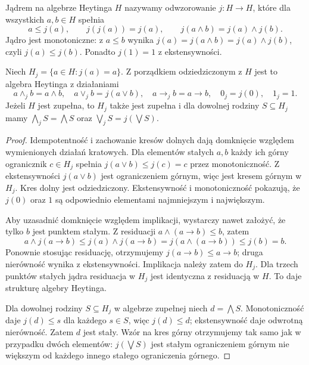 \begin{definicja}[Jądro]
\label{def:ncl-heyting-nucleus}
Jądrem na algebrze Heytinga $H$ nazywamy
odwzorowanie $j:H\to H$, które dla wszystkich
$a,b\in H$ spełnia
\[
 a\leq j(a),\qquad j(j(a))=j(a),\qquad
 j(a\wedge b)=j(a)\wedge j(b).
\]
Jądro jest monotoniczne: z $a\leq b$ wynika
$j(a)=j(a\wedge b)=j(a)\wedge j(b)$,
czyli $j(a)\leq j(b)$.
Ponadto $j(1)=1$ z ekstensywności.
\end{definicja}

\begin{twierdzenie}
\label{thm:ncl-heyting-nucleus-fixed}
Niech $H_j=\{a\in H:j(a)=a\}$.
Z porządkiem odziedziczonym z $H$ jest to algebra
Heytinga z działaniami
\[
 a\wedge_j b=a\wedge b,\quad
 a\vee_j b=j(a\vee b),\quad
 a\to_j b=a\to b,\quad
 0_j=j(0),\quad 1_j=1.
\]
Jeżeli $H$ jest zupełna, to $H_j$ także jest zupełna
i dla dowolnej rodziny $S\subseteq H_j$ mamy
$\bigwedge_j S=\bigwedge S$ oraz
$\bigvee_j S=j(\bigvee S)$.
\end{twierdzenie}
\begin{proof}
Idempotentność i zachowanie kresów dolnych dają
domknięcie względem wymienionych działań kratowych.
Dla elementów stałych $a,b$ każdy ich górny
ogranicznik $c\in H_j$ spełnia
$j(a\vee b)\leq j(c)=c$ przez monotoniczność.
Z ekstensywności $j(a\vee b)$ jest ograniczeniem
górnym, więc jest kresem górnym w $H_j$.
Kres dolny jest odziedziczony. Ekstensywność
i monotoniczność pokazują, że $j(0)$ oraz $1$
są odpowiednio elementami najmniejszym i największym.

Aby uzasadnić domknięcie względem implikacji,
wystarczy nawet założyć, że tylko $b$ jest
punktem stałym. Z residuacji
$a\wedge(a\to b)\leq b$, zatem
\[
 a\wedge j(a\to b)
 \leq j(a)\wedge j(a\to b)
 =j(a\wedge(a\to b))\leq j(b)=b.
\]
Ponownie stosując residuację, otrzymujemy
$j(a\to b)\leq a\to b$; druga nierówność
wynika z ekstensywności.
Implikacja należy zatem do $H_j$.
Dla trzech punktów stałych jądra residuacja w $H_j$
jest identyczna z residuacją w $H$.
To daje strukturę algebry Heytinga.

Dla dowolnej rodziny $S\subseteq H_j$ w algebrze
zupełnej niech $d=\bigwedge S$.
Monotoniczność daje $j(d)\leq s$ dla każdego
$s\in S$, więc $j(d)\leq d$; ekstensywność daje
odwrotną nierówność. Zatem $d$ jest stały.
Wzór na kres górny otrzymujemy tak samo jak
w przypadku dwóch elementów: $j(\bigvee S)$
jest stałym ograniczeniem górnym nie większym
od każdego innego stałego ograniczenia górnego.
\end{proof}

